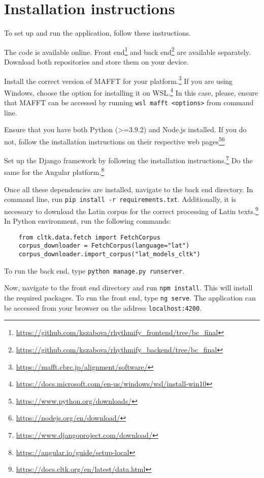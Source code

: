 \chapter{Installation instructions}
\label{attachment:setup}

To set up and run the application, follow these instructions.

The code is available online. Front end\footnote{\url{https://github.com/kszabova/rhythmify_frontend/tree/bc_final}}
and back end\footnote{\url{https://github.com/kszabova/rhythmify_backend/tree/bc_final}} are available separately.
Download both repositories and store them on your device.

Install the correct version of MAFFT for your platform.\footnote{\url{https://mafft.cbrc.jp/alignment/software/}} If you
are using Windows, choose the option for installing it on WSL.\footnote{\url{https://docs.microsoft.com/en-us/windows/wsl/install-win10}}
In this case, please, ensure that MAFFT can be accessed by running \verb|wsl mafft <options>| from command line.

Ensure that you have both Python (\textgreater =3.9.2) and Node.js installed. If you do not, follow the installation instructions
on their respective web pages\footnote{\url{https://www.python.org/downloads/}}\footnote{\url{https://nodejs.org/en/download/}}

Set up the Django framework by following the installation instructions.\footnote{\url{https://www.djangoproject.com/download/}}
Do the same for the Angular platform.\footnote{\url{https://angular.io/guide/setup-local}}

Once all these dependencies are installed, navigate to the back end directory. In command line, run \verb|pip install -r requirements.txt|.
Additionally, it is necessary to download the Latin corpus for the correct processing of Latin texts.\footnote{\url{https://docs.cltk.org/en/latest/data.html}}
In Python environment, run the following commands:

\begin{verbatim}
    from cltk.data.fetch import FetchCorpus
    corpus_downloader = FetchCorpus(language="lat")
    corpus_downloader.import_corpus("lat_models_cltk")
\end{verbatim}

To run the back end, type \verb|python manage.py runserver|.

Now, navigate to the front end directory and run \verb|npm install|. This will install the required packages.
To run the front end, type \verb|ng serve|.
The application can be accessed from your browser on the address \verb|localhost:4200|.
